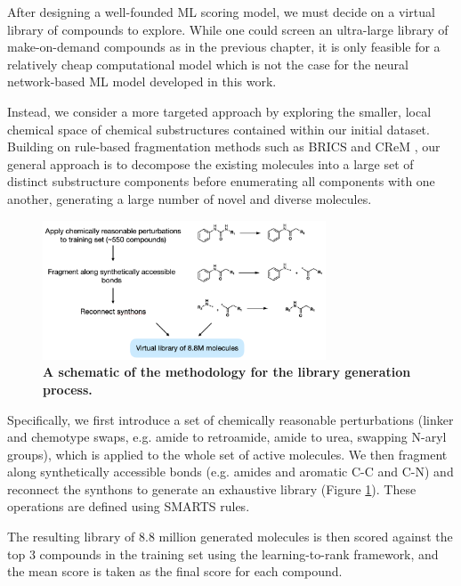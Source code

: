 After designing a well-founded ML scoring model, we must decide on a virtual library of compounds to explore. While one could screen an ultra-large library of make-on-demand compounds as in the previous chapter, it is only feasible for a relatively cheap computational model which is not the case for the neural network-based ML model developed in this work. 

Instead, we consider a more targeted approach by exploring the smaller, local chemical space of chemical substructures contained within our initial dataset. Building on rule-based fragmentation methods such as BRICS \cite{Degen2008brics} and CReM \cite{Polishchuk2020Crem}, our general approach is to decompose the existing molecules into a large set of distinct substructure components before enumerating all components with one another, generating a large number of novel and diverse molecules. 

\begin{figure}[!th]
 \centering
 \includegraphics[width=0.75\textwidth]{Chapters/Ranking/Figs/library.png}
 \caption{\textbf{A schematic of the methodology for the library generation process.}}
 \label{fig:library}
\end{figure}

Specifically, we first introduce a set of chemically reasonable perturbations (linker and chemotype swaps, e.g. amide to retroamide, amide to urea, swapping N-aryl groups), which is applied to the whole set of active molecules. We then fragment along synthetically accessible bonds (e.g. amides and aromatic C-C and C-N) and reconnect the synthons to generate an exhaustive library (Figure \ref{fig:library}). These operations are defined using SMARTS rules.

The resulting library of 8.8 million generated molecules is then scored against the top 3 compounds in the training set using the learning-to-rank framework, and the mean score is taken as the final score for each compound.

